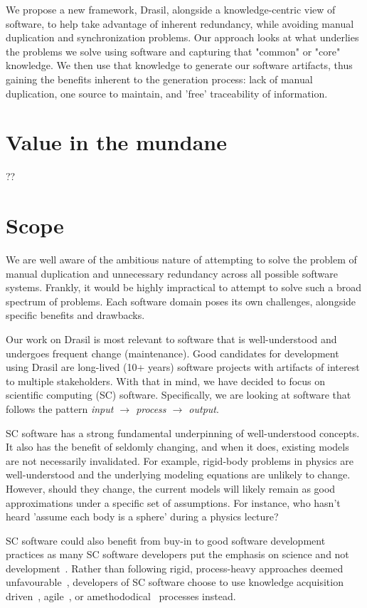We propose a new framework, Drasil, alongside a knowledge-centric view of
software, to help take advantage of inherent redundancy, while avoiding manual
duplication and synchronization problems. Our approach looks at what underlies
the problems we solve using software and capturing that "common" or "core"
knowledge. We then use that knowledge to generate our software artifacts, thus
gaining the benefits inherent to the generation process: lack of manual
duplication, one source to maintain, and 'free' traceability of information.

\section{Value in the mundane}
??

\section{Scope}
\label{sec:scope}
We are well aware of the ambitious nature of attempting to solve the problem of
manual duplication and unnecessary redundancy across all possible software
systems. Frankly, it would be highly impractical to attempt to solve such a
broad spectrum of problems. Each software domain poses its own challenges,
alongside specific benefits and drawbacks. 

Our work on Drasil is most relevant to software that is well-understood and 
undergoes frequent change (maintenance). Good candidates for development using
Drasil are long-lived (10+ years) software projects with artifacts of interest
to multiple stakeholders. With that in mind, we have decided to focus on
scientific computing (SC) software. Specifically, we are looking at software 
that follows the pattern \emph{input $\rightarrow$ process $\rightarrow$ 
output}.

SC software has a strong fundamental underpinning of well-understood concepts.
It also has the benefit of seldomly changing, and when it does, existing models
are not necessarily invalidated. For example, rigid-body problems in physics are
well-understood and the underlying modeling equations are unlikely to change.
However, should they change, the current models will likely remain as good
approximations under a specific set of assumptions. For instance, who hasn't
heard 'assume each body is a sphere' during a physics lecture?

SC software could also benefit from buy-in to good software development 
practices as many SC software developers put the emphasis on science and not 
development~\citep{Kelly2007}. Rather than following rigid, process-heavy 
approaches deemed unfavourable~\citep{CarverEtAl2007}, developers of SC 
software choose to use knowledge acquisition driven~\citep{Kelly2015}, 
agile~\citep{Segal2005, CarverEtAl2007, AckroydEtAl2008, 
EasterbrookAndJohns2009}, or amethododical~\citep{Kelly2013} processes instead.

